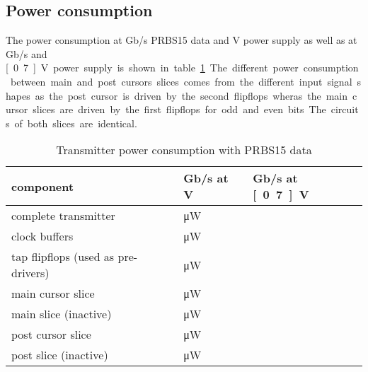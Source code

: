 \subsection{Power consumption}

The power consumption at \unit[10]{Gb/s} PRBS15 data and \unit[1]{V} power supply as well as at \unit[2]{Gb/s} and \unit[0.7]{V} power supply is shown in table \ref{tab:power_consumption_tx}. The different power consumption between main and post cursors slices comes from the different input signal shapes as the post cursor is driven by the second flipflops wheras the main cursor slices are driven by the first flipflops for odd and even bits. The circuits of both slices are identical.

\begin{table}[H] %
  \centering %
  \begin{tabular}{l|l|l}
    component & \unit[10]{Gb/s} at \unit[1]{V} & \unit[2]{Gb/s} at \unit[0.7]{V}\\
    \hline
    complete transmitter &  \unit[]{\uW}\\
    clock buffers & \unit[]{\uW}\\
    tap flipflops (used as pre-drivers) & \unit[3610]{\uW}\\
    main cursor slice &  \unit[1239]{\uW}\\
    main slice (inactive) &  \unit[1,548]{\uW}\\
    post cursor slice &  \unit[1189]{\uW}\\
    post slice (inactive) &  \unit[1,802]{\uW}\\      
  \end{tabular}
  \caption{Transmitter power consumption with PRBS15 data}
  \label{tab:power_consumption_tx}
\end{table}

